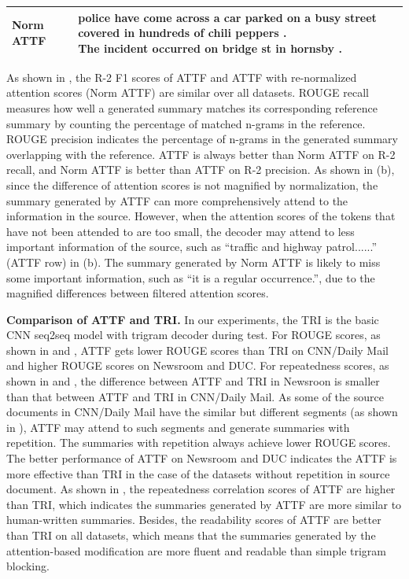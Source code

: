 \begin{table}[th!]
\begin{center}
{\begin{tabular}{ll}
				\hline
				Norm ATTF & \tabincell{l}{police have come across a car parked on a busy street covered in hundreds of chili peppers . \\ The incident occurred on bridge st in hornsby .} \\
				\bottomrule[1.2pt]
			\end{tabular}
		}
		\label{tab:norm}
	\end{center}
\end{table}


As shown in , the R-2 F1 scores of ATTF and ATTF with re-normalized attention scores (Norm ATTF) are similar over all datasets. 
ROUGE recall measures how well a generated summary matches
its corresponding reference summary by counting the percentage of matched n-grams in the reference.
ROUGE precision 
indicates the percentage of n-grams in the generated summary overlapping with the reference.
ATTF is always better than Norm ATTF on R-2 recall,
and Norm ATTF is better than ATTF on R-2 precision.
As shown in (b), since the difference of attention scores is not magnified by normalization, 
the summary generated by ATTF can more comprehensively attend to the information in the source. 
However, when the attention scores of the tokens that have not been attended to are too small, the decoder may attend to less important information of the source, 
such as ``traffic and highway patrol......'' (ATTF row) in (b).
The summary generated by Norm ATTF is likely to miss some important information,
such as ``it is a regular occurrence.'',
due to the magnified differences between filtered attention scores.

\textbf{Comparison of ATTF and TRI.} In our experiments, 
the TRI is the basic CNN seq2seq model with trigram decoder during test.
For ROUGE scores, as shown in  and ,
ATTF gets lower ROUGE scores than TRI on CNN/Daily Mail and higher ROUGE scores on Newsroom and DUC. 
For repeatedness scores, as shown in  and , the difference between ATTF and TRI in Newsroon is smaller than that between ATTF and TRI in CNN/Daily Mail.
As some of the source documents in CNN/Daily Mail have the similar but different segments (as shown in ), 
ATTF may attend to such segments and generate summaries with repetition.
The summaries with repetition always achieve lower ROUGE scores.
The better performance of ATTF on Newsroom and DUC 
indicates the ATTF is more effective than TRI in the case of the datasets without repetition in source document.
As shown in , the repeatedness correlation scores of ATTF are higher than TRI, which indicates the summaries generated by ATTF are more similar to human-written summaries.
Besides, the readability scores of ATTF are better than TRI on all datasets,
which means that the summaries generated by the attention-based modification 
are more fluent and readable than simple trigram blocking.


